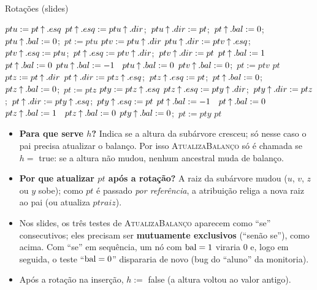 \begin{pseudo}{Rotações (slides)}
\begin{algorithmic}
  \State $ptu:=pt\mathbin{\uparrow}.esq$
   
    \State $pt\mathbin{\uparrow}.esq:=ptu\mathbin{\uparrow}.dir$;\ $ptu\mathbin{\uparrow}.dir:=pt$;\ $pt\mathbin{\uparrow}.bal:=0$;\ $ptu\mathbin{\uparrow}.bal:=0$;\ $pt:=ptu$
  \Else {}
    \State $ptv:=ptu\mathbin{\uparrow}.dir$
    \State $ptu\mathbin{\uparrow}.dir:=ptv\mathbin{\uparrow}.esq$;\ $ptv\mathbin{\uparrow}.esq:=ptu$;\ $pt\mathbin{\uparrow}.esq:=ptv\mathbin{\uparrow}.dir$;\ $ptv\mathbin{\uparrow}.dir:=pt$
     $pt\mathbin{\uparrow}.bal:=1$ \Else\ $pt\mathbin{\uparrow}.bal:=0$ \EndIf
     $ptu\mathbin{\uparrow}.bal:=-1$ \Else\ $ptu\mathbin{\uparrow}.bal:=0$ \EndIf
    \State $ptv\mathbin{\uparrow}.bal:=0$;\ $pt:=ptv$
  \EndIf
  \State \Return $pt$
\EndFunction
{}
  \State $ptz:=pt\mathbin{\uparrow}.dir$
   
    \State $pt\mathbin{\uparrow}.dir:=ptz\mathbin{\uparrow}.esq$;\ $ptz\mathbin{\uparrow}.esq:=pt$;\ $pt\mathbin{\uparrow}.bal:=0$;\ $ptz\mathbin{\uparrow}.bal:=0$;\ $pt:=ptz$
  \Else {}
    \State $pty:=ptz\mathbin{\uparrow}.esq$
    \State $ptz\mathbin{\uparrow}.esq:=pty\mathbin{\uparrow}.dir$;\ $pty\mathbin{\uparrow}.dir:=ptz$;\ $pt\mathbin{\uparrow}.dir:=pty\mathbin{\uparrow}.esq$;\ $pty\mathbin{\uparrow}.esq:=pt$
     $pt\mathbin{\uparrow}.bal:=-1$ \Else\ $pt\mathbin{\uparrow}.bal:=0$ \EndIf
     $ptz\mathbin{\uparrow}.bal:=1$ \Else\ $ptz\mathbin{\uparrow}.bal:=0$ \EndIf
    \State $pty\mathbin{\uparrow}.bal:=0$;\ $pt:=pty$
  \EndIf
  \State \Return $pt$
\EndFunction
\end{algorithmic}
\end{pseudo}

\begin{cuidado}
\begin{itemize}
  \item \textbf{Para que serve $h$?} Indica se a altura da subárvore cresceu; só nesse caso o pai precisa atualizar o balanço. Por isso \textsc{AtualizaBalanço} só é chamada se $h=$ true: se a altura não mudou, nenhum ancestral muda de balanço.
  \item \textbf{Por que atualizar $pt$ após a rotação?} A raiz da subárvore mudou ($u$, $v$, $z$ ou $y$ sobe); como $pt$ é passado \emph{por referência}, a atribuição religa a nova raiz ao pai (ou atualiza $ptraiz$).
  \item Nos slides, os três testes de \textsc{AtualizaBalanço} aparecem como ``se'' consecutivos; eles precisam ser \textbf{mutuamente exclusivos} (``senão se''), como acima. Com ``se'' em sequência, um nó com $\operatorname{bal}=1$ viraria $0$ e, logo em seguida, o teste ``$\operatorname{bal}=0$'' dispararia de novo (bug do ``aluno'' da monitoria).
  \item Após a rotação na inserção, $h:=$ false (a altura voltou ao valor antigo).
\end{itemize}
\end{cuidado}

